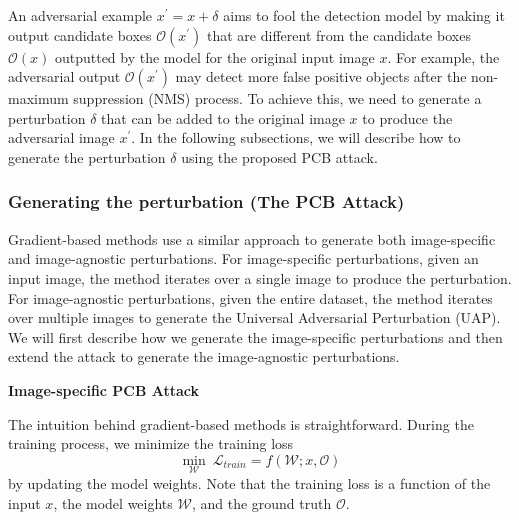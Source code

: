 
An adversarial example $x^{'} = x + \delta$ aims to fool the detection model by making it output candidate boxes $\mathcal{O}(x^{'})$ that are different from the candidate boxes $\mathcal{O}(x)$ outputted by the model for the original input image $x$. For example, the adversarial output $\mathcal{O}(x^{'})$ may detect more false positive objects after the non-maximum suppression (NMS) process. To achieve this, we need to generate a perturbation $\delta$ that can be added to the original image $x$ to produce the adversarial image $x^{'}$. In the following subsections, we will describe how to generate the perturbation $\delta$ using the proposed PCB attack.

\subsubsection{Generating the perturbation (The PCB Attack)}


Gradient-based methods use a similar approach to generate both image-specific and image-agnostic perturbations. For image-specific perturbations, given an input image, the method iterates over a single image to produce the perturbation. 
For image-agnostic perturbations, given the entire dataset, the method iterates over multiple images to generate the Universal Adversarial Perturbation (UAP). We will first describe how we generate the image-specific perturbations and then extend the attack to generate the image-agnostic perturbations.

\textbf{Image-specific PCB Attack}

The intuition behind gradient-based methods is straightforward. During the training process, we minimize the training loss 
\begin{equation}
\min_{\mathcal{W}} \ \mathcal{L}_{train} = f(\mathcal{W}; x, \mathcal{O})
\end{equation}
by updating the model weights. Note that the training loss is a function of the input $x$, the model weights $\mathcal{W}$, and the ground truth $\mathcal{O}$. 

